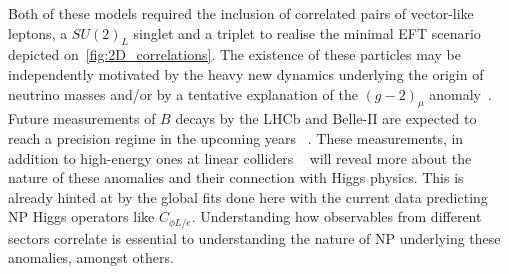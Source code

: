 Both of these models required the inclusion of correlated pairs of vector-like leptons, a $SU(2)_L$ singlet and a triplet to realise the minimal EFT scenario depicted on~\autoref{fig:2D_correlations}. The existence of these particles may be independently motivated by the heavy new dynamics underlying the origin of neutrino masses and/or by a tentative explanation of the $(g-2)_{\mu}$ anomaly~\cite{Kannike:2011ng,Muong-2:2021ojo}.\\

Future measurements of $B$ decays by the LHCb and Belle-II are expected to reach a precision regime in the upcoming years ~\cite{Kou:2018nap,Bediaga:2018lhg}. These measurements, in addition to high-energy ones at linear colliders ~\cite{deBlas:2019rxi,deBlas:2019wgy} will reveal more about the nature of these anomalies and their connection with Higgs physics. This is already hinted at by the global fits done here with the current data predicting NP Higgs operators like $ C_{\phi L/e}$. Understanding how observables from different sectors correlate is essential to understanding the nature of NP underlying these anomalies, amongst others.


%
%

